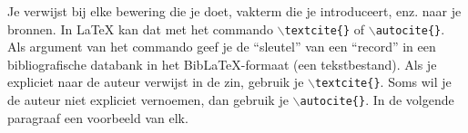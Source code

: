 Je verwijst bij elke bewering die je doet, vakterm die je introduceert, enz. naar je bronnen. In \LaTeX{} kan dat met het commando \texttt{$\backslash${textcite\{\}}} of \texttt{$\backslash${autocite\{\}}}. Als argument van het commando geef je de ``sleutel'' van een ``record'' in een bibliografische databank in het Bib\LaTeX{}-formaat (een tekstbestand). Als je expliciet naar de auteur verwijst in de zin, gebruik je \texttt{$\backslash${}textcite\{\}}.
Soms wil je de auteur niet expliciet vernoemen, dan gebruik je \texttt{$\backslash${}autocite\{\}}. In de volgende paragraaf een voorbeeld van elk.


\lipsum[7-20]
